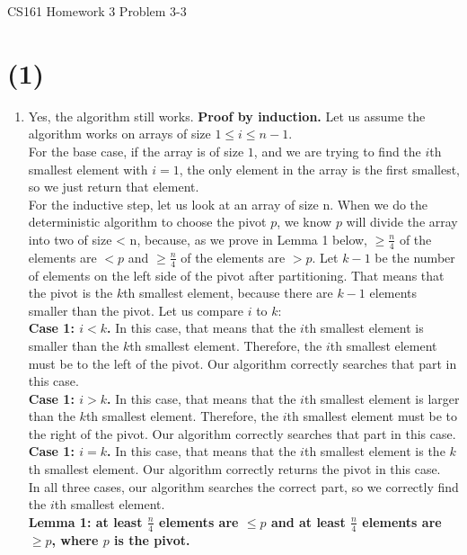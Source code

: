 \documentclass[12pt]{article}
\begin{document}
\begin{center}
{\Large CS161 Homework 3 Problem 3-3}

\end{center}

\section*{(1)}

\begin{enumerate}[label=(\alph*)]
  \item Yes, the algorithm still works. \textbf{Proof by induction.} Let us assume the algorithm works on arrays of size $1 \le i \le n-1$. \\
  For the base case, if the array is of size $1$, and we are trying to find the $i$th smallest element with $i = 1$, the only element in the array is the first smallest, so we just return that element.\\ 
  For the inductive step, let us look at an array of size n. When we do the deterministic algorithm to choose the pivot $p$, we know $p$ will divide the array into two of size < n, because, as we prove in Lemma 1 below, $\ge \frac{n}{4}$ of the elements are $< p$ and $\ge \frac{n}{4}$ of the elements are $> p$. Let $k-1$ be the number of elements on the left side of the pivot after partitioning. That means that the pivot is the $k$th smallest element, because there are $k-1$ elements smaller than the pivot. Let us compare $i$ to $k$:\\
  \textbf{Case 1: $i < k$.} In this case, that means that the $i$th smallest element is smaller than the $k$th smallest element. Therefore, the $i$th smallest element must be to the left of the pivot. Our algorithm correctly searches that part in this case.\\
  \textbf{Case 1: $i > k$.} In this case, that means that the $i$th smallest element is larger than the $k$th smallest element. Therefore, the $i$th smallest element must be to the right of the pivot. Our algorithm correctly searches that part in this case.\\
  \textbf{Case 1: $i = k$.} In this case, that means that the $i$th smallest element is the $k$th smallest element. Our algorithm correctly returns the pivot in this case.\\
  In all three cases, our algorithm searches the correct part, so we correctly find the $i$th smallest element.\\
  \textbf{Lemma 1: at least $\frac{n}{4}$ elements are $\le p$ and at least $\frac{n}{4}$ elements are $\ge p$, where $p$ is the pivot.}\\

\end{enumerate}
\end{document}
